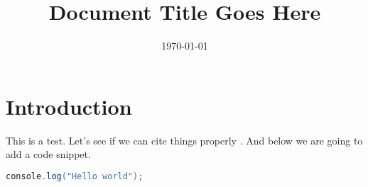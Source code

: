 \documentclass[12pt,twoside]{article}
\title{Document Title Goes Here \\
  }
\author{}
\date{\today}
\begin{document}
\maketitle

\tableofcontents
\listoffigures
\lstlistoflistings



\section{Introduction}

This is a test. Let's see if we can cite things properly
\cite{constantinides2002reasoning}. And below we are going to add a code
snippet.


\begin{lstlisting}[language=Java,caption="This is a simple Javascript program"]
  console.log("Hello world");
\end{lstlisting}



\end{document}
